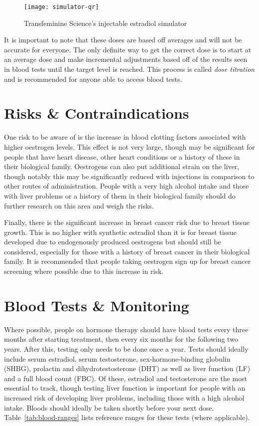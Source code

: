 \documentclass[twoside,a5paper]{article}
\begin{document}
\begin{figure}
  \centering
  \texttt{[image: simulator-qr]}
  \caption{Transfeminine Science's injectable estradiol simulator}
  \label{fig:simulator-qr}
\end{figure}

It is important to note that these doses are based off averages and
will not be accurate for everyone.  The only definite way to get the
correct dose is to start at an average dose and make incremental
adjustments based off of the results seen in blood tests until the
target level is reached.  This process is called \textit{dose
  titration} and is recommended for anyone able to access blood tests.

\section{Risks \& Contraindications}

One risk to be aware of is the increase in blood clotting factors
associated with higher oestrogen levels.  This effect is not very
large, though may be significant for people that have heart disease,
other heart conditions or a history of these in their biological
family.  Oestrogens can also put additional strain on the liver,
though notably this may be significantly reduced with injections in
comparison to other routes of administration.  People with a very high
alcohol intake and those with liver problems or a history of them in
their biological family should do further research on this area and
weigh the risks.

Finally, there is the significant increase in breast cancer risk due
to breast tissue growth.  This is no higher with synthetic estradiol
than it is for breast tissue developed due to endogenously produced
oestrogens but should still be considered, especially for those with a
history of breast cancer in their biological family.  It is
recommended that people taking oestrogen sign up for breast cancer
screening where possible due to this increase in risk.

\section{Blood Tests \& Monitoring}

Where possible, people on hormone therapy should have blood tests
every three months after starting treatment, then every six months for
the following two years.  After this, testing only needs to be done
once a year.  Tests should ideally include serum estradiol, serum
testosterone, sex-hormone-binding globulin (SHBG), prolactin and
dihydrotestosterone (DHT) as well as liver function (LF) and a full
blood count (FBC).  Of these, estradiol and testosterone are the most
essential to track, though testing liver function is important for
people with an increased risk of developing liver problems, including
those with a high alcohol intake.  Bloods should ideally be taken
shortly before your next dose.  Table~\ref{tab:blood-ranges} lists
reference ranges for these tests (where applicable).
\end{document}
